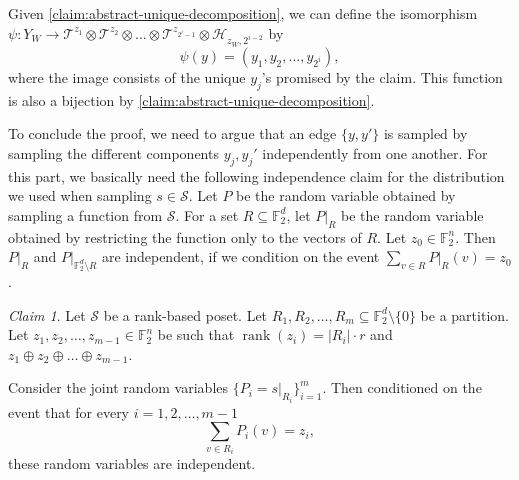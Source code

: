 \documentclass[10pt,a4paper]{article}
\newcommand{\prettyref}[1]{\cref{#1}}
\theoremstyle{definition}
\theoremstyle{remark}
\newtheorem{claim}[theorem]{Claim}
\newcommand{\Authornotecolored}[3]{{\sffamily\small\color{#1}{[#2: #3]}}}
\newcommand{\Authornotecolored}[3]{}
\newcommand{\Ynote}{\Authornotecolored{Purple}{Y}}
\newcommand{\Snote}{\Authornotecolored{Green}{S}}
\newcommand{\snote}{\Snote}
\newcommand{\set}[1]{\{#1\}}
\newcommand{\F}{\mathbb{F}}
\DeclareMathOperator{\rank}{rank}
\renewcommand{\leq}{\leqslant}
\numberwithin{equation}{section}
\let\pref=\prettyref
\def\Y{Y}
\begin{document}
Given \pref{claim:abstract-unique-decomposition}, we can define the isomorphism \(\psi: \Y_W \to \mathcal{T}^{z_1} \otimes \mathcal{T}^{z_2} \otimes \dots \otimes \mathcal{T}^{z_{2^i-1}} \otimes \mathcal{H}_{z_W,2^{i-2}}\) by \begin{equation}\label{eq:iso-for-decomp-lemma}
\psi(y)=(y_1,y_2,\dots,y_{2^i}),
\end{equation}
where the image consists of the unique \(y_j\)'s promised by the claim. This function is also a bijection by \pref{claim:abstract-unique-decomposition}.

To conclude the proof, we need to argue that an edge \(\set{y,y'}\) is sampled by sampling the different components \(y_j,y_j'\) independently from one another. For this part, we basically need the following independence claim for the distribution we used when sampling \(s \in \mathcal{S}\). Let \(P\) be the random variable obtained by sampling a function from \(\mathcal{S}\). For a set \(R \subseteq \F_2^d\), let \(P|_R\) be the random variable obtained by restricting the function only to the vectors of \(R\). Let \(z_0 \in \F_2^n\). Then \(P|_{R}\) and \(P|_{\F_2^d \setminus R}\) are independent, if we condition on the event \(\sum_{v \in R}P|_R(v) = z_0\).


\begin{claim} \label{claim:independence-given-sums}
    Let \(\mathcal{S}\) be a rank-based poset. Let \(R_1,R_2,\dots,R_m \subseteq \F_2^d \setminus \set{0}\) be a partition.  Let \(z_1,z_2,\dots,z_{m-1} \in \F_2^n\) be such that \(\rank(z_i) = |R_i|\cdot r\) and \(z_1 \oplus z_2 \oplus \dots \oplus z_{m-1}\). %

    Consider the joint random variables \(\set{P_i = s|_{R_i}}_{i=1}^m\). Then conditioned on the event that for every \(i=1,2,\dots,m-1\)
    \[\sum_{v \in R_i} P_i(v)=z_i,\]
    these random variables are independent.
\end{claim}
\end{document}
